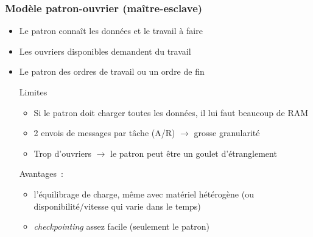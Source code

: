 \documentclass[xcolor={x11names,svgnames}]{beamer}
\begin{document}
\begin{frame}
\frametitle{Modèle patron-ouvrier (maître-esclave)}


\begin{itemize} 
\item Le patron connaît les données et le travail à faire
\item Les ouvriers disponibles demandent du travail
\item Le patron des ordres de travail ou un ordre de fin

\begin{alertblock}{Limites}
\begin{itemize}
\item Si le patron doit charger toutes les données, il lui faut beaucoup de RAM
\item 2 envois de messages par tâche (A/R) $\longrightarrow$ grosse granularité
\item Trop d'ouvriers $\rightarrow$ le patron peut être un goulet d'étranglement
\end{itemize}
\end{alertblock}

\begin{exampleblock}{Avantages~:}
\begin{itemize}
\item l'équilibrage de charge, même avec matériel hétérogène (ou disponibilité/vitesse qui varie dans le temps)
\item \emph{checkpointing} assez facile (seulement le patron)
\end{itemize}
\end{exampleblock}

\end{itemize}

\end{frame}
\end{document}
